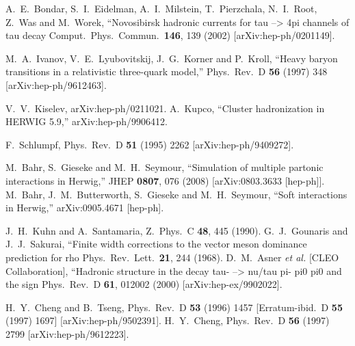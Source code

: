\documentclass{article}
\begin{document}
\begin{thebibliography}{99}
  A.~E.~Bondar, S.~I.~Eidelman, A.~I.~Milstein, T.~Pierzchala, N.~I.~Root, Z.~Was and M.~Worek,
   ``Novosibirsk hadronic currents for tau --> 4pi channels of tau decay
  Comput.\ Phys.\ Commun.\  {\bf 146}, 139 (2002)
  [arXiv:hep-ph/0201149].

  M.~A.~Ivanov, V.~E.~Lyubovitskij, J.~G.~Korner and P.~Kroll,
  ``Heavy baryon transitions in a relativistic three-quark model,''
  Phys.\ Rev.\  D {\bf 56} (1997) 348
  [arXiv:hep-ph/9612463].

 V.~V.~Kiselev, arXiv:hep-ph/0211021.
  A.~Kupco,
  ``Cluster hadronization in HERWIG 5.9,''
  arXiv:hep-ph/9906412.

F.~Schlumpf,
Phys.\ Rev.\  D {\bf 51} (1995) 2262 [arXiv:hep-ph/9409272].

  M.~Bahr, S.~Gieseke and M.~H.~Seymour,
  ``Simulation of multiple partonic interactions in Herwig,''
  JHEP {\bf 0807}, 076 (2008)
  [arXiv:0803.3633 [hep-ph]].
  M.~Bahr, J.~M.~Butterworth, S.~Gieseke and M.~H.~Seymour,
  ``Soft interactions in Herwig,''
  arXiv:0905.4671 [hep-ph].

  J.~H.~Kuhn and A.~Santamaria,
  Z.\ Phys.\  C {\bf 48}, 445 (1990).
  G.~J.~Gounaris and J.~J.~Sakurai,
   ``Finite width corrections to the vector meson dominance prediction for rho
  Phys.\ Rev.\ Lett.\  {\bf 21}, 244 (1968).
  D.~M.~Asner {\it et al.}  [CLEO Collaboration],
   ``Hadronic structure in the decay tau- --> nu/tau pi- pi0 pi0 and the  sign
  Phys.\ Rev.\  D {\bf 61}, 012002 (2000)
  [arXiv:hep-ex/9902022].

  H.~Y.~Cheng and B.~Tseng,
  Phys.\ Rev.\  D {\bf 53} (1996) 1457
  [Erratum-ibid.\  D {\bf 55} (1997) 1697]
  [arXiv:hep-ph/9502391].
  H.~Y.~Cheng,
  Phys.\ Rev.\  D {\bf 56} (1997) 2799
  [arXiv:hep-ph/9612223].


\end{thebibliography}
\end{document}
